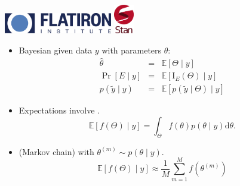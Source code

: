 \documentclass[10pt]{report}
\begin{document}
\sf%
\vspace*{-12pt}
%
\noindent
\spc{\Huge\bfseries \color{MidnightBlue}{WALNUTS:}}
\\[6pt]
\spc{\LARGE\bfseries \color{MidnightBlue}{Per-leapfrog step size
    adaptation for HMC}}
\\[16pt]
\noindent
\spc{\Large\bfseries \color{MidnightBlue}{Bob Carpenter}}
\\[6pt]
\\
\\[12pt]
\vfill
\hfill
\includegraphics[height=0.35in]{img/fi-logo.png}
\qquad
\includegraphics[height=0.5in]{img/stan-logo.png}

\begin{itemize}
\item Bayesian  given data $y$ with parameters $\theta$:
\begin{eqnarray*}
  \widehat{\theta} & = & \mathbb{E}[\Theta \mid y]
  \\
  \Pr[E \mid y] & = & \mathbb{E}[\textrm{I}_E(\Theta) \mid y]
  \\
  p(\widetilde{y} \mid y) & = & \mathbb{E}[p(\widetilde{y} \mid
                                \Theta) \mid y]
\end{eqnarray*}
\item Expectations involve .
  $$ \mathbb{E}[f(\Theta) \mid y] = \int_\Theta f(\theta) p(\theta
  \mid y) \textrm{d}\theta. $$
\item (Markov chain)  with $\theta^{(m)} \sim p(\theta \mid y).$
  $$ \mathbb{E}[f(\Theta) \mid y] \approx \frac{1}{M} \sum_{m=1}^M
  f(\theta^{(m)}) $$
\end{itemize}
\end{document}
